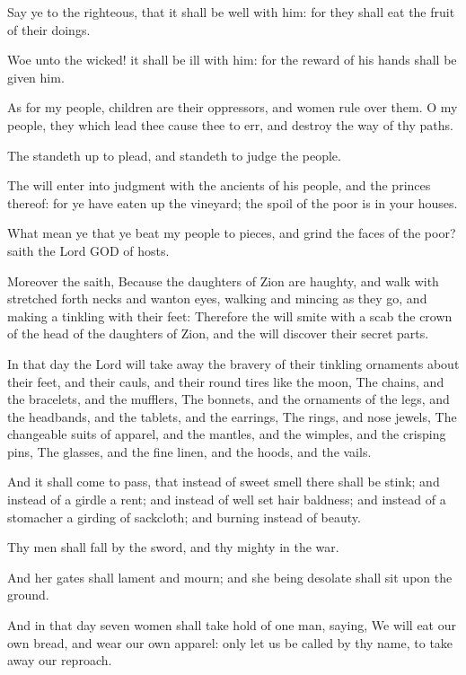 \Verse Say ye to the righteous, that it shall be well with him: for they shall eat the fruit of their doings.

\Verse Woe unto the wicked! it shall be ill with him: for the reward of his hands shall be given him.

\Verse As for my people, children are their oppressors, and women rule over them. O my people, they which lead thee cause thee to err, and destroy the way of thy paths.

\Verse The \LORD standeth up to plead, and standeth to judge the people.

\Verse The \LORD will enter into judgment with the ancients of his people, and the princes thereof: for ye have eaten up the vineyard; the spoil of the poor is in your houses.

\Verse What mean ye that ye beat my people to pieces, and grind the faces of the poor? saith the Lord GOD of hosts.

\Verse Moreover the \LORD saith, Because the daughters of Zion are haughty, and walk with stretched forth necks and wanton eyes, walking and mincing as they go, and making a tinkling with their feet: \Verse Therefore the \LORD will smite with a scab the crown of the head of the daughters of Zion, and the \LORD will discover their secret parts.

\Verse In that day the Lord will take away the bravery of their tinkling ornaments about their feet, and their cauls, and their round tires like the moon, \Verse The chains, and the bracelets, and the mufflers, \Verse The bonnets, and the ornaments of the legs, and the headbands, and the tablets, and the earrings, \Verse The rings, and nose jewels, \Verse The changeable suits of apparel, and the mantles, and the wimples, and the crisping pins, \Verse The glasses, and the fine linen, and the hoods, and the vails.

\Verse And it shall come to pass, that instead of sweet smell there shall be stink; and instead of a girdle a rent; and instead of well set hair baldness; and instead of a stomacher a girding of sackcloth; and burning instead of beauty.

\Verse Thy men shall fall by the sword, and thy mighty in the war.

\Verse And her gates shall lament and mourn; and she being desolate shall sit upon the ground.


\Chapter
\Verse And in that day seven women shall take hold of one man, saying, We will eat our own bread, and wear our own apparel: only let us be called by thy name, to take away our reproach.


